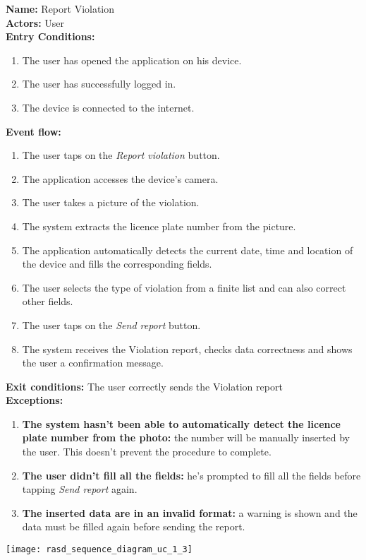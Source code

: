 \begin{usecase}{1.3}
    \textbf{Name: }Report Violation \\
    \textbf{Actors: } User \\
    \textbf{Entry Conditions:}
    \begin{enumerate}
        \item The user has opened the application on his device.
        \item The user has successfully logged in.
        \item The device is connected to the internet.
    \end{enumerate}
    \textbf{Event flow:}
    \begin{enumerate}
        \item The user taps on the \emph{Report violation} button.
        \item The application accesses the device's camera.
        \item The user takes a picture of the violation.
        \item The system extracts the licence plate number from the picture.
        \item The application automatically detects the current date, time
        and location of the device and fills the corresponding fields.
        \item The user selects the type of violation from a finite list and
        can also correct other fields.
        \item The user taps on the \emph{Send report} button.
        \item The system receives the Violation report, checks data correctness
        and shows the user a confirmation message.
    \end{enumerate}
    \textbf{Exit conditions: } The user correctly sends the Violation report \\
    \textbf{Exceptions: }
    \begin{enumerate}
        \item \textbf{The system hasn't been able to automatically detect the
        licence plate number from the photo:} the number will be manually
        inserted by the user. This doesn't prevent the procedure to complete.
        \item \textbf{The user didn't fill all the fields:} he's prompted to
        fill all the fields before tapping \emph{Send report} again.
        \item \textbf{The inserted data are in an invalid format:} a warning is
        shown and the data must be filled again before sending the report.
    \end{enumerate}
    \tcblower
    \centering
    \texttt{[image: rasd\_sequence\_diagram\_uc\_1\_3]}
\end{usecase}